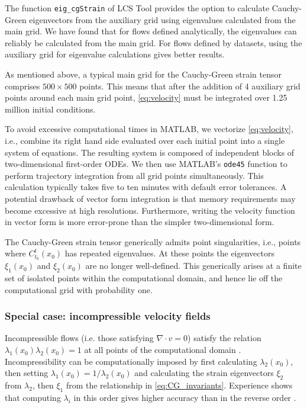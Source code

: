 \documentclass{elsarticle}
\begin{document}
The function \lstinline!eig_cgStrain! of LCS Tool provides the option to calculate Cauchy-Green eigenvectors from the auxiliary grid using eigenvalues calculated from the main grid. We have found that for flows defined analytically, the eigenvalues can reliably be calculated from the main grid. For flows defined by datasets, using the auxiliary grid for eigenvalue calculations gives better results.

As mentioned above, a typical main grid for the Cauchy-Green strain tensor comprises $500 \times 500$ points. This means that after the addition of 4 auxiliary grid points around each main grid point, \cref{eq:velocity} must be integrated over 1.25 million initial conditions.

To avoid excessive computational times in MATLAB, we vectorize \cref{eq:velocity}, i.e., combine its right hand side evaluated over each initial point into a single system of equations. The resulting system is composed of independent blocks of two-dimensional first-order ODEs. We then use MATLAB's \lstinline!ode45! function to perform trajectory integration from all grid points simultaneously. This calculation typically takes five to ten minutes with default error tolerances. A potential drawback of vector form integration is that memory requirements may become excessive at high resolutions. Furthermore, writing the velocity function in vector form is more error-prone than the simpler two-dimensional form.

The Cauchy-Green strain tensor generically admits point singularities, i.e., points where $C_{t_0}^t(x_0)$ has repeated eigenvalues. At these points the eigenvectors $\xi_1(x_0)$ and $\xi_2(x_0)$ are no longer well-defined. This generically arises at a finite set of isolated points within the computational domain\citep{delmarcelle94}, and hence lie off the computational grid with probability one.

\subsubsection{Special case: incompressible velocity fields}

Incompressible flows (i.e. those satisfying $\nabla \cdot v=0$) satisfy the relation $\lambda_1(x_0) \lambda_2(x_0) = 1$ at all points of the computational domain \citep{arnold78:_mathem}. Incompressibility can be computationally imposed by first calculating $\lambda_2(x_0)$, then setting $\lambda_1(x_0) = 1/\lambda_2(x_0)$ and calculating the strain eigenvectors $\xi_2$ from $\lambda_2$, then $\xi_1$ from the relationship in \cref{eq:CG_invariants}. Experience shows that computing $\lambda_i$ in this order gives higher accuracy than in the reverse order \citep{farazmand12:_comput_lagran}.
\end{document}
